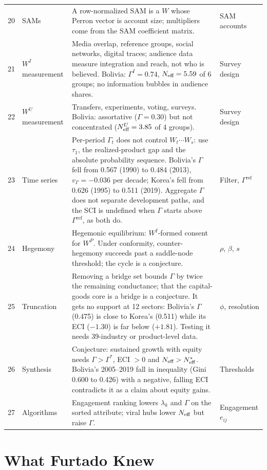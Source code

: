 \documentclass[../structural_economics_book.tex]{subfiles}
\begin{document}
{\begin{longtable}{@{}r>{\raggedright\arraybackslash}p{2.5cm}>{\raggedright\arraybackslash}p{7.6cm}>{\raggedright\arraybackslash}p{3.1cm}@{}}
20 & SAMs & A row-normalized SAM is a $W$ whose Perron vector is account size; multipliers come from the SAM coefficient matrix. & SAM accounts \\
21 & $W^I$ measurement & Media overlap, reference groups, social networks, digital traces; audience data measure integration and reach, not who is believed. Bolivia: $\Gamma^I = 0.74$, $N_{\text{eff}} = 5.59$ of 6 groups; no information bubbles in audience shares. & Survey design \\
22 & $W^U$ measurement & Transfers, experiments, voting, surveys. Bolivia: assortative ($\Gamma = 0.30$) but not concentrated ($N_{\text{eff}}^U = 3.85$ of 4 groups). & Survey design \\
23 & Time series & Per-period $\Gamma_t$ does not control $W_t\cdots W_s$: use $\tau_1$, the realized-product gap and the absolute probability sequence. Bolivia's $\Gamma$ fell from 0.567 (1990) to 0.484 (2013), $v_\Gamma = -0.036$ per decade; Korea's fell from 0.626 (1995) to 0.511 (2019). Aggregate $\Gamma$ does not separate development paths, and the SCI is undefined when $\Gamma$ starts above $\Gamma^{\text{ref}}$, as both do. & Filter, $\Gamma^{\text{ref}}$ \\
24 & Hegemony & Hegemonic equilibrium: $W^I$-formed consent for $W^P$. Under conformity, counter-hegemony succeeds past a saddle-node threshold; the cycle is a conjecture. & $\rho$, $\beta$, $s$ \\
25 & Truncation & Removing a bridge set bounds $\Gamma$ by twice the remaining conductance; that the capital-goods core is a bridge is a conjecture. It gets no support at 12 sectors: Bolivia's $\Gamma$ (0.475) is close to Korea's (0.511) while its ECI ($-1.30$) is far below ($+1.81$). Testing it needs 39-industry or product-level data. & $\phi$, resolution \\
26 & Synthesis & Conjecture: sustained growth with equity needs $\Gamma > \Gamma^*$, ECI $> 0$ and $N_{\text{eff}} > N^*_{\text{eff}}$. Bolivia's 2005--2019 fall in inequality (Gini 0.600 to 0.426) with a negative, falling ECI contradicts it as a claim about equity gains. & Thresholds \\
27 & Algorithms & Engagement ranking lowers $\lambda_k$ and $\Gamma$ on the sorted attribute; viral hubs lower $N_{\text{eff}}$ but raise $\Gamma$. & Engagement $e_{ij}$ \\
\bottomrule
\end{longtable}
}


\section{What Furtado Knew}
\label{ch28:sec:furtado}
\end{document}
